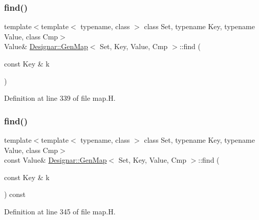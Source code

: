 \subsubsection{\texorpdfstring{find()}{find()}\hspace{0.1cm}{\footnotesize\ttfamily [1/4]}}
{\footnotesize\ttfamily template$<$template$<$ typename, class $>$ class Set, typename Key, typename Value, class Cmp$>$ \\
Value\& \hyperlink{class_designar_1_1_gen_map}{Designar\+::\+Gen\+Map}$<$ Set, Key, Value, Cmp $>$\+::find (\begin{DoxyParamCaption}\item[{const Key \&}]{k }\end{DoxyParamCaption})\hspace{0.3cm}{\ttfamily [inline]}}



Definition at line 339 of file map.\+H.

\mbox{\label{class_designar_1_1_gen_map_a0df2bf3aab592ee2343bc2855839bc96}} 
\subsubsection{\texorpdfstring{find()}{find()}\hspace{0.1cm}{\footnotesize\ttfamily [2/4]}}
{\footnotesize\ttfamily template$<$template$<$ typename, class $>$ class Set, typename Key, typename Value, class Cmp$>$ \\
const Value\& \hyperlink{class_designar_1_1_gen_map}{Designar\+::\+Gen\+Map}$<$ Set, Key, Value, Cmp $>$\+::find (\begin{DoxyParamCaption}\item[{const Key \&}]{k }\end{DoxyParamCaption}) const\hspace{0.3cm}{\ttfamily [inline]}}



Definition at line 345 of file map.\+H.

\mbox{\label{class_designar_1_1_gen_map_ae02aaa8835abada7b361da281c6125bf}} 
